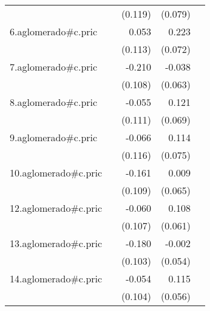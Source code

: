 {\begin{longtable}{l*{4}{D{.}{.}{-1}}}
            &                     &     (0.119)         &     (0.079)         &                     \\
\addlinespace
6.aglomerado#c.pric&                     &       0.053         &       0.223\sym{**} &                     \\
            &                     &     (0.113)         &     (0.072)         &                     \\
\addlinespace
7.aglomerado#c.pric&                     &      -0.210         &      -0.038         &                     \\
            &                     &     (0.108)         &     (0.063)         &                     \\
\addlinespace
8.aglomerado#c.pric&                     &      -0.055         &       0.121         &                     \\
            &                     &     (0.111)         &     (0.069)         &                     \\
\addlinespace
9.aglomerado#c.pric&                     &      -0.066         &       0.114         &                     \\
            &                     &     (0.116)         &     (0.075)         &                     \\
\addlinespace
10.aglomerado#c.pric&                     &      -0.161         &       0.009         &                     \\
            &                     &     (0.109)         &     (0.065)         &                     \\
\addlinespace
12.aglomerado#c.pric&                     &      -0.060         &       0.108         &                     \\
            &                     &     (0.107)         &     (0.061)         &                     \\
\addlinespace
13.aglomerado#c.pric&                     &      -0.180         &      -0.002         &                     \\
            &                     &     (0.103)         &     (0.054)         &                     \\
\addlinespace
14.aglomerado#c.pric&                     &      -0.054         &       0.115\sym{*}  &                     \\
            &                     &     (0.104)         &     (0.056)         &                     \\

\end{longtable}}
